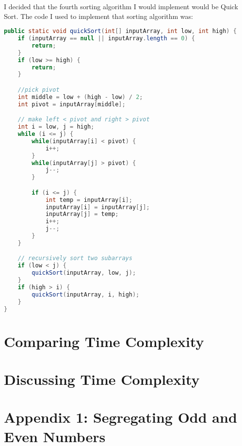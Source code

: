 \documentclass{report}
\begin{document}
I decided that the fourth sorting algorithm I would implement would be Quick Sort. The code I used to implement that sorting algorithm was:

\begin{lstlisting}[language=java, caption=Quicksort implementation]
public static void quickSort(int[] inputArray, int low, int high) {
    if (inputArray == null || inputArray.length == 0) {
        return;
    }
    if (low >= high) {
        return;
    }

    //pick pivot
    int middle = low + (high - low) / 2;
    int pivot = inputArray[middle];

    // make left < pivot and right > pivot
    int i = low, j = high;
    while (i <= j) {
        while(inputArray[i] < pivot) {
            i++;
        }
        while(inputArray[j] > pivot) {
            j--;
        }

        if (i <= j) {
            int temp = inputArray[i];
            inputArray[i] = inputArray[j];
            inputArray[j] = temp;
            i++;
            j--;
        }
    }

    // recursively sort two subarrays
    if (low < j) {
        quickSort(inputArray, low, j);
    }
    if (high > i) {
        quickSort(inputArray, i, high);
    }
}
\end{lstlisting}

\chapter{Comparing Time Complexity}



\chapter{Discussing Time Complexity}

\chapter*{Appendix 1: Segregating Odd and Even Numbers}
\end{document}
